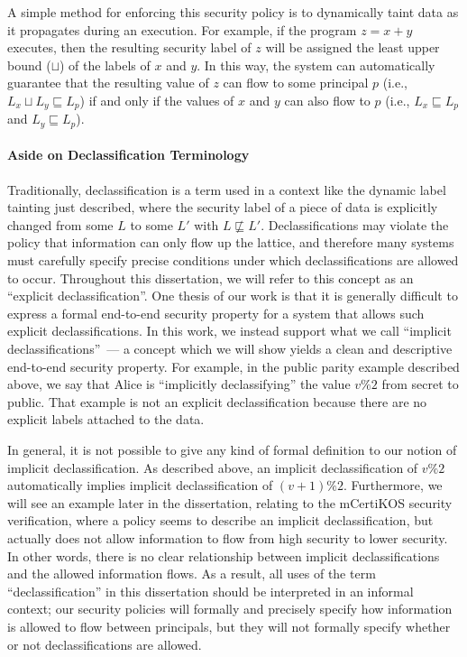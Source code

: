 A simple method for enforcing this security policy is to dynamically 
taint data as it propagates during an execution. For example,
if the program $z = x + y$ executes, then the resulting security label 
of $z$ will be assigned the least upper bound ($\sqcup$) of the labels 
of $x$ and $y$. In this way, the system can automatically guarantee that
the resulting value of $z$ can flow to some principal $p$ (i.e., 
$L_x \sqcup L_y \sqsubseteq L_p$) if and only if the values of $x$ and $y$ 
can also flow to $p$ (i.e., $L_x \sqsubseteq L_p$ and $L_y \sqsubseteq L_p$).

\paragraph{Aside on Declassification Terminology}
Traditionally, declassification is a term used in a context like the 
dynamic label tainting just described, where the security label of a 
piece of data is explicitly changed from some $L$ to some $L'$ with
$L \not\sqsubseteq L'$. Declassifications may violate the policy that information
can only flow up the lattice, and therefore many systems must carefully 
specify precise conditions under which declassifications are allowed to occur. 
Throughout this dissertation, we will refer to this concept as
an ``explicit declassification''. One thesis of our work is that it
is generally difficult to express a formal end-to-end security property
for a system that allows such explicit declassifications. In this work,
we instead support what we call ``implicit declassifications''~---
a concept which we will show yields a clean and descriptive end-to-end security 
property. For example, in the public parity example described above, we say that Alice
is ``implicitly declassifying'' the value $v\%2$ from secret to public. That
example is not an explicit declassification because there are no explicit
labels attached to the data.

In general, it is not possible to give any kind of formal 
definition to our notion of implicit declassification. As described above,
an implicit declassification of $v\%2$ automatically implies implicit declassification
of $(v+1)\%2$. Furthermore, we will see an example later in the dissertation,
relating to the mCertiKOS security verification, where a policy seems to
describe an implicit declassification, but actually does not allow information
to flow from high security to lower security. In other words, there is no clear relationship
between implicit declassifications and the allowed information flows. As a result,
all uses of the term ``declassification'' in this dissertation should be interpreted in 
an informal context; our security policies will formally and precisely specify how 
information is allowed to flow between principals, but they will not formally specify 
whether or not declassifications are allowed.

